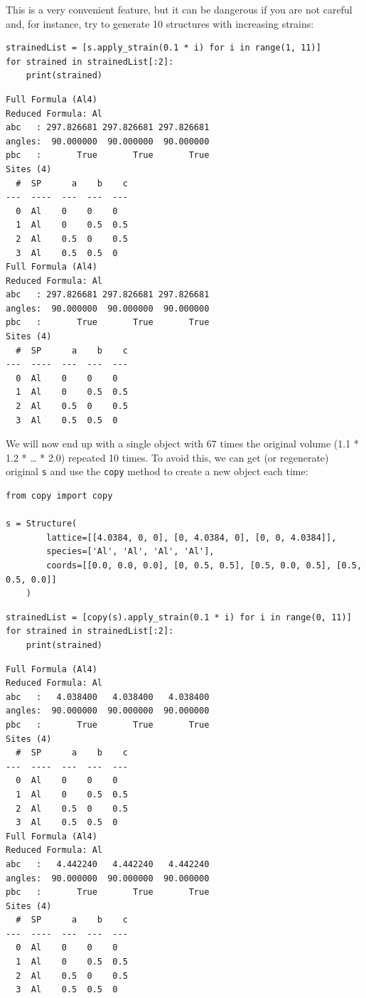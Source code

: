 This is a very convenient feature, but it can be dangerous if you are
not careful and, for instance, try to generate 10 structures with
increasing strains:

\begin{verbatim}
strainedList = [s.apply_strain(0.1 * i) for i in range(1, 11)]
for strained in strainedList[:2]:
    print(strained)
\end{verbatim}

\begin{verbatim}
Full Formula (Al4)
Reduced Formula: Al
abc   : 297.826681 297.826681 297.826681
angles:  90.000000  90.000000  90.000000
pbc   :       True       True       True
Sites (4)
  #  SP      a    b    c
---  ----  ---  ---  ---
  0  Al    0    0    0
  1  Al    0    0.5  0.5
  2  Al    0.5  0    0.5
  3  Al    0.5  0.5  0
Full Formula (Al4)
Reduced Formula: Al
abc   : 297.826681 297.826681 297.826681
angles:  90.000000  90.000000  90.000000
pbc   :       True       True       True
Sites (4)
  #  SP      a    b    c
---  ----  ---  ---  ---
  0  Al    0    0    0
  1  Al    0    0.5  0.5
  2  Al    0.5  0    0.5
  3  Al    0.5  0.5  0
\end{verbatim}

We will now end up with a single object with 67 times the original
volume (1.1 * 1.2 * \ldots{} * 2.0) repeated 10 times. To avoid this, we
can get (or regenerate) original \texttt{s} and use the
\texttt{copy} method to create a new object each time:

\begin{verbatim}
from copy import copy

s = Structure(
        lattice=[[4.0384, 0, 0], [0, 4.0384, 0], [0, 0, 4.0384]],
        species=['Al', 'Al', 'Al', 'Al'],
        coords=[[0.0, 0.0, 0.0], [0, 0.5, 0.5], [0.5, 0.0, 0.5], [0.5, 0.5, 0.0]]
    )
\end{verbatim}

\begin{verbatim}
strainedList = [copy(s).apply_strain(0.1 * i) for i in range(0, 11)]
for strained in strainedList[:2]:
    print(strained)
\end{verbatim}

\begin{verbatim}
Full Formula (Al4)
Reduced Formula: Al
abc   :   4.038400   4.038400   4.038400
angles:  90.000000  90.000000  90.000000
pbc   :       True       True       True
Sites (4)
  #  SP      a    b    c
---  ----  ---  ---  ---
  0  Al    0    0    0
  1  Al    0    0.5  0.5
  2  Al    0.5  0    0.5
  3  Al    0.5  0.5  0
Full Formula (Al4)
Reduced Formula: Al
abc   :   4.442240   4.442240   4.442240
angles:  90.000000  90.000000  90.000000
pbc   :       True       True       True
Sites (4)
  #  SP      a    b    c
---  ----  ---  ---  ---
  0  Al    0    0    0
  1  Al    0    0.5  0.5
  2  Al    0.5  0    0.5
  3  Al    0.5  0.5  0
\end{verbatim}

